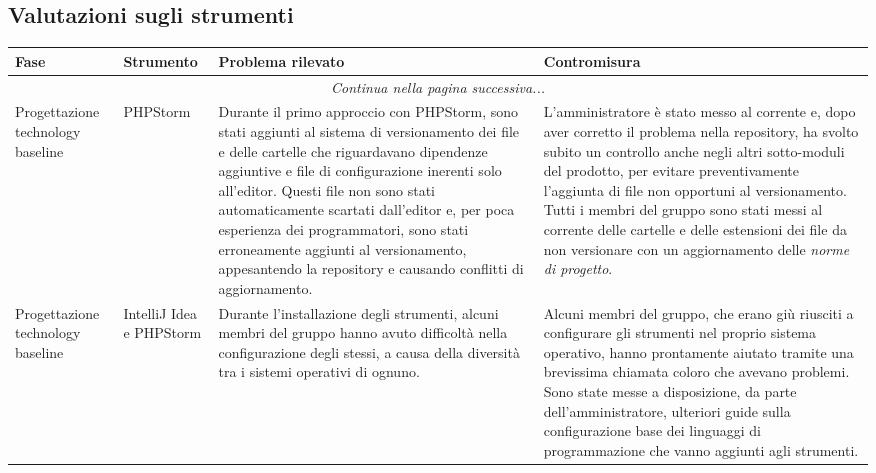 	\subsection{Valutazioni sugli strumenti}

		\begin{center}
			\begin{longtable}{|p{2.5cm}|p{2.5cm}|p{5cm}|p{5cm}|}
				\hline
				\rowcolor{lighter-grayer}
				\textbf{Fase} & \textbf{Strumento} & \textbf{Problema rilevato} & \textbf{Contromisura}\\
				\hline
				\endfirsthead
				\hline
			    \multicolumn{4}{|c|}{\textit{Continua nella pagina successiva...}}\\
			    \hline
			    \endfoot
			    \endlastfoot

			    \hline
			    Progettazione technology baseline
			    &
				PHPStorm
				&
				Durante il primo approccio con PHPStorm, sono stati aggiunti al sistema di versionamento dei file e delle cartelle che riguardavano dipendenze aggiuntive e file di configurazione inerenti solo all'editor. Questi file non sono stati automaticamente scartati dall'editor e, per poca esperienza dei programmatori, sono stati erroneamente aggiunti al versionamento, appesantendo la repository e causando conflitti di aggiornamento.
				&
				L'amministratore è stato messo al corrente e, dopo aver corretto il problema nella repository, ha svolto subito un controllo anche negli altri sotto-moduli del prodotto, per evitare preventivamente l'aggiunta di file non opportuni al versionamento. Tutti i membri del gruppo sono stati messi al corrente delle cartelle e delle estensioni dei file da non versionare con un aggiornamento delle \textit{norme di progetto}.\\

			    \hline
			    Progettazione technology baseline
			    &
				IntelliJ Idea e PHPStorm
				&
				Durante l'installazione degli strumenti, alcuni membri del gruppo hanno avuto difficoltà nella configurazione degli stessi, a causa della diversità tra i sistemi operativi di ognuno.
				&
				Alcuni membri del gruppo, che erano giù riusciti a configurare gli strumenti nel proprio sistema operativo, hanno prontamente aiutato tramite una brevissima chiamata \glock{Discord} coloro che avevano problemi. Sono state messe a disposizione, da parte dell'amministratore, ulteriori guide sulla configurazione base dei linguaggi di programmazione che vanno aggiunti agli strumenti. \\
			    \hline
			 


\end{longtable}
\end{center}
